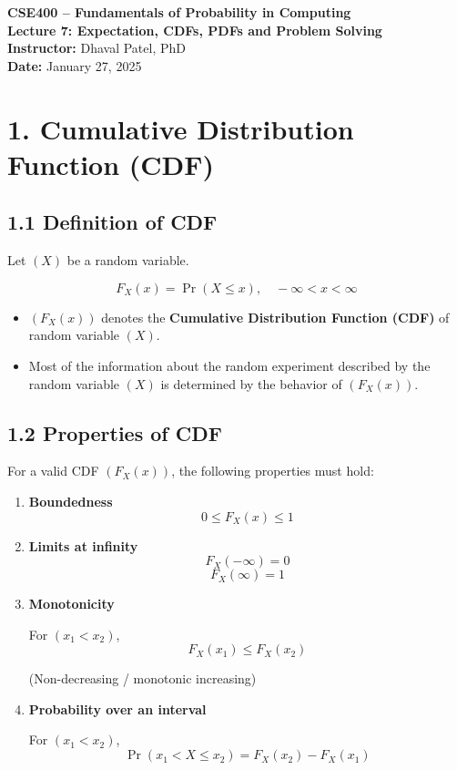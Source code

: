 \documentclass[12pt]{article}
\begin{document}
\begin{center}
\textbf{\Large CSE400 -- Fundamentals of Probability in Computing} \\[0.2cm]
\textbf{\large Lecture 7: Expectation, CDFs, PDFs and Problem Solving} \\[0.2cm]
\textbf{Instructor:} Dhaval Patel, PhD \\
\textbf{Date:} January 27, 2025
\end{center}

\vspace{0.5cm}

\section*{1. Cumulative Distribution Function (CDF)}

\subsection*{1.1 Definition of CDF}

Let $(X)$ be a random variable.

\[
F_X(x) = \Pr(X \le x), \quad -\infty < x < \infty
\]

\begin{itemize}
\item $(F_X(x))$ denotes the \textbf{Cumulative Distribution Function (CDF)} of random variable $(X)$.
\item Most of the information about the random experiment described by the random variable $(X)$ is determined by the behavior of $(F_X(x))$.
\end{itemize}

\subsection*{1.2 Properties of CDF}

For a valid CDF $(F_X(x))$, the following properties must hold:

\begin{enumerate}[label=\arabic*.]
\item \textbf{Boundedness}
\[
0 \le F_X(x) \le 1
\]

\item \textbf{Limits at infinity}
\[
F_X(-\infty) = 0
\]
\[
F_X(\infty) = 1
\]

\item \textbf{Monotonicity}

For $(x_1 < x_2)$,
\[
F_X(x_1) \le F_X(x_2)
\]

(Non-decreasing / monotonic increasing)

\item \textbf{Probability over an interval}

For $(x_1 < x_2)$,
\[
\Pr(x_1 < X \le x_2) = F_X(x_2) - F_X(x_1)
\]
\end{enumerate}
\end{document}
